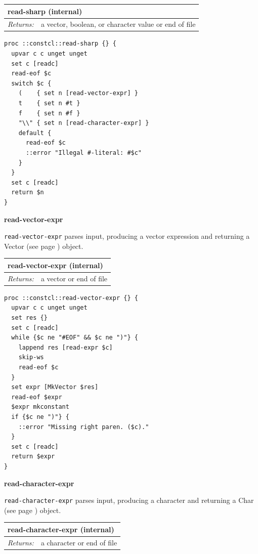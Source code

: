 \documentclass[twoside,9pt]{report}
\begin{document}
\begin{tabular}{ |l l| }
\hline
\multicolumn{2}{|l|}{read-sharp (internal)} \\
\hline
\textit{Returns:} & a vector, boolean, or character value or end of file \\
\hline
\end{tabular}

\noindent\makebox[\linewidth]{\rule{\linewidth}{0.4pt}}
\begin{lstlisting}
proc ::constcl::read-sharp {} {
  upvar c c unget unget
  set c [readc]
  read-eof $c
  switch $c {
    (    { set n [read-vector-expr] }
    t    { set n #t }
    f    { set n #f }
    "\\" { set n [read-character-expr] }
    default {
      read-eof $c
      ::error "Illegal #-literal: #$c"
    }
  }
  set c [readc]
  return $n
}
\end{lstlisting}
\noindent\makebox[\linewidth]{\rule{\linewidth}{0.4pt}}

\textbf{read-vector-expr}


\texttt{read-vector-expr} parses input, producing a vector expression and returning a Vector (see page \pageref{vectors}) object.

\begin{tabular}{ |l l| }
\hline
\multicolumn{2}{|l|}{read-vector-expr (internal)} \\
\hline
\textit{Returns:} & a vector or end of file \\
\hline
\end{tabular}

\noindent\makebox[\linewidth]{\rule{\linewidth}{0.4pt}}
\begin{lstlisting}
proc ::constcl::read-vector-expr {} {
  upvar c c unget unget
  set res {}
  set c [readc]
  while {$c ne "#EOF" && $c ne ")"} {
    lappend res [read-expr $c]
    skip-ws
    read-eof $c
  }
  set expr [MkVector $res]
  read-eof $expr
  $expr mkconstant
  if {$c ne ")"} {
    ::error "Missing right paren. ($c)."
  }
  set c [readc]
  return $expr
}
\end{lstlisting}
\noindent\makebox[\linewidth]{\rule{\linewidth}{0.4pt}}

\textbf{read-character-expr}


\texttt{read-character-expr} parses input, producing a character and returning a Char (see page \pageref{characters}) object.

\begin{tabular}{ |l l| }
\hline
\multicolumn{2}{|l|}{read-character-expr (internal)} \\
\hline
\textit{Returns:} & a character or end of file \\
\hline
\end{tabular}
\end{document}
